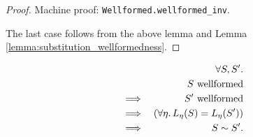 \documentclass{llncs}
\newcommand*{\sequiv}{\sim}
\newcommand*{\wf}[1]{\text{$#1$ {\normalfont \rmfamily wellformed}}}
\renewcommand*{\|}{\;|\;}
\newcommand*{\machproofc}[1]{Machine proof: \code{#1}.}
\newcommand*{\code}[1]{\texttt{#1}}
\begin{document}
\begin{proof}
  \machproofc{Wellformed.wellformed\_inv}

  The last case follows from the above lemma and Lemma
  \ref{lemma:substitution_wellformedness}.
\end{proof}


\begin{theorem}
  \label{th:equality_equivalence}
  \begin{eqnarray*}
    &&         \forall S, S'. \\
    &&         \wf{S} \\
    &\implies& \wf{S'} \\
    &\implies& (\forall \eta.\, L_\eta(S) = L_\eta(S')) \\
    &\implies& S \sequiv S'.
  \end{eqnarray*}
\end{theorem}
\end{document}
